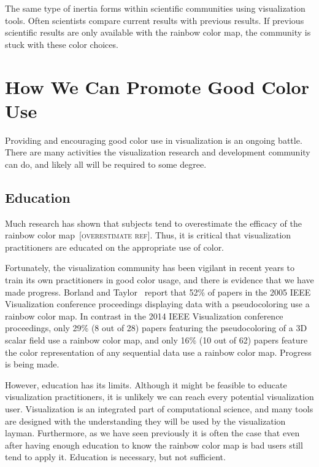 \documentclass[letterpaper,twocolumn,fleqn]{article}
\newcommand*{\lcite}[1]{~\cite{#1}}
\newcommand*{\scite}[1]{~\cite{#1}}
\newcommand{\fix}[1]{{\color{red}\textsc{[#1]}}}
\begin{document}
The same type of inertia forms within scientific communities using
visualization tools. Often scientists compare current results with previous
results. If previous scientific results are only available with the rainbow
color map, the community is stuck with these color choices.


\section{How We Can Promote Good Color Use}

\noindent
Providing and encouraging good color use in visualization is an ongoing
battle. There are many activities the visualization research and
development community can do, and likely all will be required to some
degree.

\subsection{Education}

\noindent
Much research has shown that subjects tend to overestimate the efficacy of
the rainbow color map\lcite{Borkin2011}\fix{overestimate ref}. Thus, it is critical
that visualization practitioners are educated on the appropriate use of
color.

Fortunately, the visualization community has been vigilant in recent years
to train its own practitioners in good color usage, and there is evidence
that we have made progress. Borland and Taylor\scite{Borland2007} report
that 52\% of papers in the 2005 IEEE Visualization conference proceedings
displaying data with a pseudocoloring use a rainbow color map. In contrast
in the 2014 IEEE Visualization conference proceedings, only 29\% (8 out of
28) papers featuring the pseudocoloring of a 3D scalar field use a rainbow
color map, and only 16\% (10 out of 62) papers feature the color
representation of any sequential data use a rainbow color map. Progress is
being made.

However, education has its limits. Although it might be feasible to educate
visualization practitioners, it is unlikely we can reach every potential
visualization user. Visualization is an integrated part of computational
science, and many tools are designed with the understanding they will be
used by the visualization layman. Furthermore, as we have seen previously
it is often the case that even after having enough education to know the
rainbow color map is bad users still tend to apply it. Education is
necessary, but not sufficient.
\end{document}
